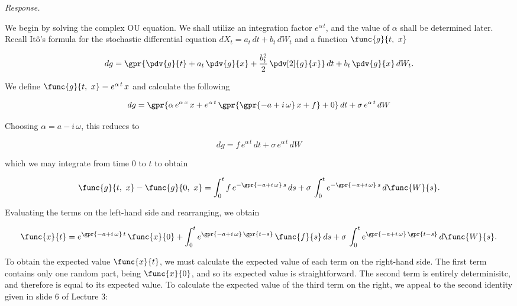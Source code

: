 \textit{Response.} 

We begin by solving the complex OU equation. We shall utilize an integration factor $e^{\alpha\,t}$, and the value of $\alpha$ shall be determined later. Recall It\^{o}'s formula for the stochastic differential equation $dX_t = a_t\,dt + b_t\,dW_t$ and a function $\func{g}{t,\ x}$

\begin{equation}
	dg = \gpr{\pdv{g}{t} + a_t\,\pdv{g}{x} + \frac{b_t^2}{2}\,\pdv[2]{g}{x}}\,dt + b_t\,\pdv{g}{x}\,dW_t.
\end{equation}

We define $\func{g}{t,\ x} = e^{\alpha\,t}\,x$ and calculate the following

\begin{equation}
	dg = \gpr{\alpha\,e^{\alpha\,x}\,x + e^{\alpha\,t}\,\gpr{\gpr{-a + i\,\omega}\,x + f} + 0}\,dt + \sigma\,e^{\alpha\,t}\,dW
\end{equation}

Choosing $\alpha = a - i\,\omega$, this reduces to

\begin{equation}
	dg = f\,e^{\alpha\,t}\,dt + \sigma\,e^{\alpha\,t}\,dW
\end{equation}

which we may integrate from time $0$ to $t$ to obtain

\begin{equation}
	\func{g}{t,\ x} - \func{g}{0,\ x} = \int_{0}^{t} f\,e^{-\gpr{-a + i\,\omega}\,s}\,ds + \sigma\,\int_{0}^{t} e^{-\gpr{-a + i\,\omega}\,s}\,d\func{W}{s}.
\end{equation}

Evaluating the terms on the left-hand side and rearranging, we obtain

\begin{equation}
	\func{x}{t} = e^{\gpr{-a + i\,\omega}\,t}\,\func{x}{0} + \int_{0}^{t} e^{\gpr{-a + i\,\omega}\,\gpr{t - s}}\,\func{f}{s}\,ds + \sigma\,\int_{0}^{t} e^{\gpr{-a + i\,\omega}\,\gpr{t - s}}\,d\func{W}{s}.
\end{equation}

To obtain the expected value $\func{x}{t}$, we must calculate the expected value of each term on the right-hand side. The first term contains only one random part, being $\func{x}{0}$, and so its expected value is straightforward. The second term is entirely determinisitc, and therefore is equal to its expected value. To calculate the expected value of the third term on the right, we appeal to the second identity given in slide 6 of Lecture 3:

